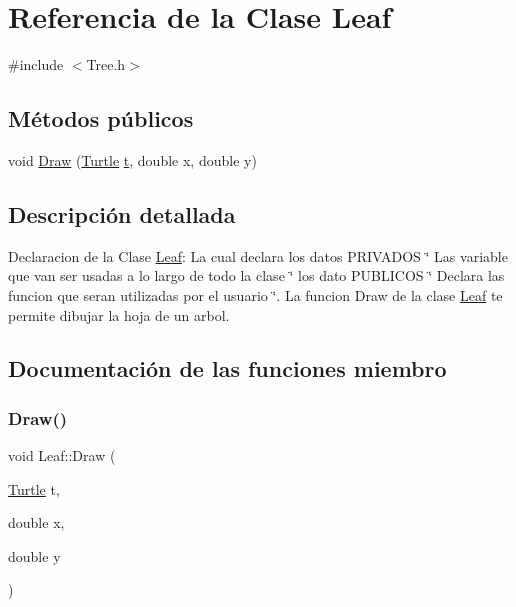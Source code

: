 \hypertarget{class_leaf}{}\section{Referencia de la Clase Leaf}
\label{class_leaf}


{\ttfamily \#include $<$Tree.\+h$>$}

\subsection*{Métodos públicos}
\begin{DoxyCompactItemize}
\item 
void \mbox{\hyperlink{class_leaf_aff1ad3dd0318a542f7c86d60858f6fc3}{Draw}} (\mbox{\hyperlink{class_turtle}{Turtle}} \mbox{\hyperlink{_abstract_8cpp_a87833ae07d42f160626b6355cd9f8cf0}{t}}, double x, double y)
\end{DoxyCompactItemize}


\subsection{Descripción detallada}
Declaracion de la Clase \mbox{\hyperlink{class_leaf}{Leaf}}\+: La cual declara los datos P\+R\+I\+V\+A\+D\+OS \char`\"{} Las variable que van ser usadas a lo largo de todo la clase \char`\"{} los dato P\+U\+B\+L\+I\+C\+OS \char`\"{} Declara las funcion que seran utilizadas por el usuario \char`\"{}. La funcion Draw de la clase \mbox{\hyperlink{class_leaf}{Leaf}} te permite dibujar la hoja de un arbol. 

\subsection{Documentación de las funciones miembro}
\mbox{\label{class_leaf_aff1ad3dd0318a542f7c86d60858f6fc3}} 
\subsubsection{\texorpdfstring{Draw()}{Draw()}}
{\footnotesize\ttfamily void Leaf\+::\+Draw (\begin{DoxyParamCaption}\item[{\mbox{\hyperlink{class_turtle}{Turtle}}}]{t,  }\item[{double}]{x,  }\item[{double}]{y }\end{DoxyParamCaption})\hspace{0.3cm}{\ttfamily [inline]}}

